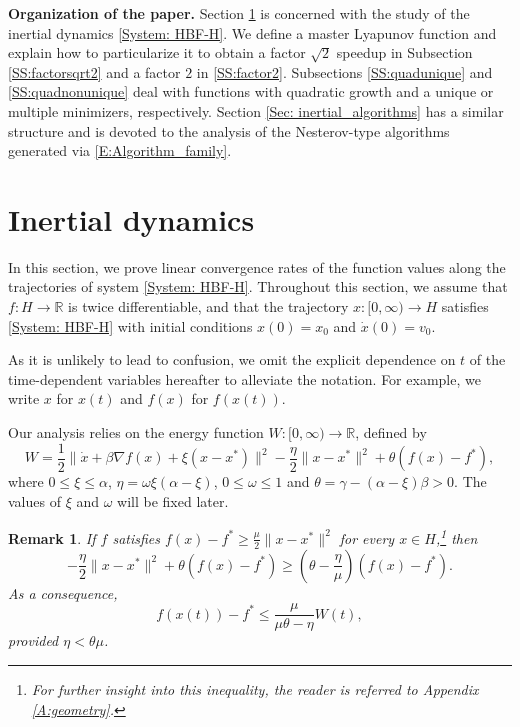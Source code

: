 \documentclass[pdflatex,sn-mathphys-num]{sn-jnl}
\theoremstyle{thmstyleone}
\theoremstyle{thmstyletwo}
\newtheorem{remark}{Remark}
\theoremstyle{thmstylethree}
\newcommand{\R}{\mathbb{R}}
\begin{document}
{\bf Organization of the paper.} Section \ref{Sec: inertial_dynamics} is concerned with the study of the inertial dynamics \eqref{System: HBF-H}. We define a master Lyapunov function and explain how to particularize it to obtain a factor $\sqrt{2}$ speedup in Subsection \ref{SS:factorsqrt2} and a factor $2$ in \ref{SS:factor2}. Subsections \ref{SS:quadunique} and \ref{SS:quadnonunique} deal with functions with quadratic growth and a unique or multiple minimizers, respectively. Section \ref{Sec: inertial_algorithms} has a similar structure and is devoted to the analysis of the Nesterov-type algorithms generated via \eqref{E:Algorithm_family}.




\section{Inertial dynamics}\label{Sec: inertial_dynamics}
In this section, we prove linear convergence rates of the function values along the trajectories of system \eqref{System: HBF-H}. Throughout this section, we assume that $f:H\to\R$ is twice differentiable, and that the trajectory $x:[0,\infty)\to H$ satisfies \eqref{System: HBF-H} with initial conditions $x(0)=x_0$ and $\dot{x}(0)=v_0$. 

As it is unlikely to lead to confusion, we omit the explicit dependence on $t$ of the time-dependent variables hereafter to alleviate the notation. For example, we write $x$ for $x(t)$ and $f(x)$ for $f\left( x(t) \right)$.

Our analysis relies on the energy function $W:[0,\infty)\to\R$, defined by 
\begin{equation}\label{E: W}
W = \frac{1}{2} \| \dot{x} + \beta\nabla f(x) + \xi( x - x^* ) \|^2 - \frac{\eta}{2} \| x - x^* \|^2 + \theta ( f(x) - f^* ),
\end{equation}
where $0\le \xi\le \alpha$, $\eta = \omega\xi(\alpha-\xi)$, $0\le\omega\le 1$ and $\theta = \gamma - (\alpha-\xi)\beta> 0$. The values of $\xi$ and $\omega$ will be fixed later. 

\begin{remark}\label{Rem: func_bound}
If $f$ satisfies $f(x) - f^*\ge \frac{\mu}{2}\|x-x^*\|^2$ for every $x\in H$,\footnote{For further insight into this inequality, the reader is referred to Appendix \ref{A:geometry}.} then
$$- \frac{\eta}{2} \| x - x^* \|^2 + \theta ( f(x) - f^* ) \ge \left( \theta - \frac{\eta}{\mu} \right)( f(x) - f^* ). $$
As a consequence,
$$ f\left(x(t)\right) - f^* \le \frac{\mu}{\mu\theta- \eta}W(t), $$
provided $\eta<\theta\mu$.
\end{remark}
\end{document}
